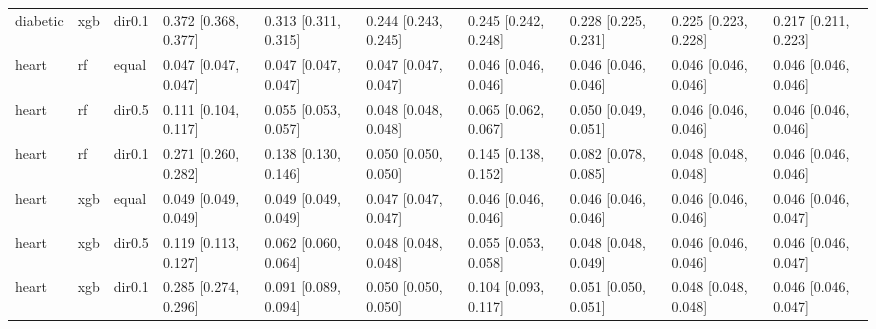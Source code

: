\begin{tabular}{llllllllll}
diabetic & xgb & dir0.1 & 0.372 [0.368, 0.377] & 0.313 [0.311, 0.315] & 0.244 [0.243, 0.245] & 0.245 [0.242, 0.248] & 0.228 [0.225, 0.231] & 0.225 [0.223, 0.228] & 0.217 [0.211, 0.223] \\
\addlinespace
heart & rf & equal & 0.047 [0.047, 0.047] & 0.047 [0.047, 0.047] & 0.047 [0.047, 0.047] & 0.046 [0.046, 0.046] & 0.046 [0.046, 0.046] & 0.046 [0.046, 0.046] & 0.046 [0.046, 0.046] \\
heart & rf & dir0.5 & 0.111 [0.104, 0.117] & 0.055 [0.053, 0.057] & 0.048 [0.048, 0.048] & 0.065 [0.062, 0.067] & 0.050 [0.049, 0.051] & 0.046 [0.046, 0.046] & 0.046 [0.046, 0.046] \\
heart & rf & dir0.1 & 0.271 [0.260, 0.282] & 0.138 [0.130, 0.146] & 0.050 [0.050, 0.050] & 0.145 [0.138, 0.152] & 0.082 [0.078, 0.085] & 0.048 [0.048, 0.048] & 0.046 [0.046, 0.046] \\
heart & xgb & equal & 0.049 [0.049, 0.049] & 0.049 [0.049, 0.049] & 0.047 [0.047, 0.047] & 0.046 [0.046, 0.046] & 0.046 [0.046, 0.046] & 0.046 [0.046, 0.046] & 0.046 [0.046, 0.047] \\
heart & xgb & dir0.5 & 0.119 [0.113, 0.127] & 0.062 [0.060, 0.064] & 0.048 [0.048, 0.048] & 0.055 [0.053, 0.058] & 0.048 [0.048, 0.049] & 0.046 [0.046, 0.046] & 0.046 [0.046, 0.047] \\
heart & xgb & dir0.1 & 0.285 [0.274, 0.296] & 0.091 [0.089, 0.094] & 0.050 [0.050, 0.050] & 0.104 [0.093, 0.117] & 0.051 [0.050, 0.051] & 0.048 [0.048, 0.048] & 0.046 [0.046, 0.047] \\
\bottomrule
\end{tabular}
